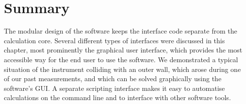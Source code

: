 \section{Summary}
The modular design of the software keeps the interface code separate from the calculation core.
Several different types of interfaces were discussed in this chapter, most prominently the graphical 
user interface, which provides the most accessible way for the end user to use the software.
We demonstrated a typical situation of the instrument colliding with an outer wall, which arose 
during one of our past measurements, and which can be solved graphically using the software's GUI.
A separate scripting interface makes it easy to automatise calculations on the command line and 
to interface with other software tools.
